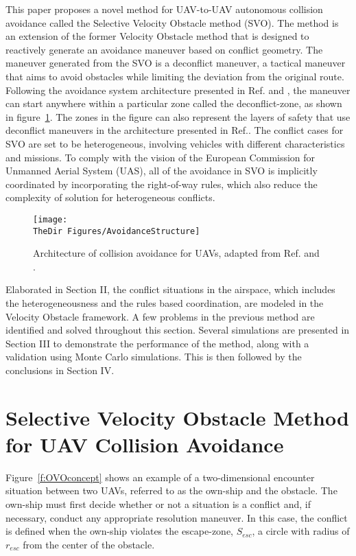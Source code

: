 This paper proposes a novel method for UAV-to-UAV autonomous collision avoidance called the Selective Velocity Obstacle method (SVO). The method is an extension of the former Velocity Obstacle method\cite{Fiorini:98} that is designed to reactively generate an avoidance maneuver based on conflict geometry. The maneuver generated from the SVO is a deconflict maneuver, a tactical maneuver that aims to avoid obstacles while limiting the deviation from the original route. Following the avoidance system architecture presented in Ref.\cite{barfield:00} and \cite{Jenie:13a}, the maneuver can start anywhere within a particular zone called the deconflict-zone, as shown in figure~\ref{f:Architecture}. The zones in the figure can also represent the layers of safety that use deconflict maneuvers in the architecture presented in Ref.\cite{Jenie:15}. The conflict cases for SVO are set to be heterogeneous, involving vehicles with different characteristics and missions. To comply with the vision of the European Commission for Unmanned Aerial System (UAS)\cite{INOUI}, all of the avoidance in SVO is implicitly coordinated by incorporating the right-of-way rules\cite{FAR:91}, which also reduce the complexity of solution for heterogeneous conflicts.

\begin{figure}[h]
\centering
 \texttt{[image: \\TheDir Figures/AvoidanceStructure]}
 \caption{Architecture of collision avoidance for UAVs, adapted from Ref.\cite{barfield:00} and  \cite{Jenie:13a}.}
 \label{f:Architecture}
\end{figure}

Elaborated in Section II, the conflict situations in the airspace, which includes the heterogeneousness and the rules based coordination, are modeled in the Velocity Obstacle framework. A few problems in the previous method are identified and solved throughout this section. Several simulations are presented in Section III to demonstrate the performance of the method, along with a validation using Monte Carlo simulations. This is then followed by the conclusions in Section IV.

\section{Selective Velocity Obstacle Method for UAV Collision Avoidance}

Figure~\ref{f:OVOconcept} shows an example of a two-dimensional encounter situation between two UAVs, referred to as the own-ship and the obstacle. The own-ship must first decide whether or not a situation is a conflict and, if necessary, conduct any appropriate resolution maneuver. In this case, the conflict is defined when the own-ship violates the escape-zone, $S_{esc}$, a circle with radius of $r_{esc}$ from the center of the obstacle.

